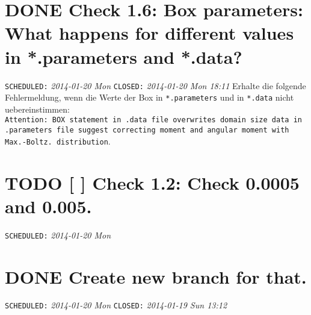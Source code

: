 \documentclass[11pt]{article}
\begin{document}
\section{\textbf{DONE} Check 1.6: Box parameters: What happens for different values in *.parameters and *.data?}
\label{sec-2}

     \texttt{SCHEDULED:} \textit{2014-01-20 Mon} \texttt{CLOSED:} \textit{2014-01-20 Mon 18:11}\newline
     Erhalte die folgende Fehlermeldung, wenn die Werte der Box in \texttt{*.parameters} und in \texttt{*.data} nicht uebereinstimmen: \\
     \texttt{Attention: BOX statement in .data file overwrites domain size data in .parameters file suggest correcting moment and angular moment with Max.-Boltz. distribution}.

\section{\textbf{TODO} [ ] Check 1.2: Check 0.0005 and 0.005.}
\label{sec-3}

     \texttt{SCHEDULED:} \textit{2014-01-20 Mon}\newline

\section{\textbf{DONE} Create new branch for that.}
\label{sec-4}

     \texttt{SCHEDULED:} \textit{2014-01-20 Mon} \texttt{CLOSED:} \textit{2014-01-19 Sun 13:12}\newline
\end{document}
